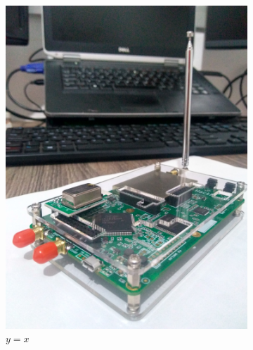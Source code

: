 \documentclass[
  12pt,				%
  openright,			%
  twoside,			%
  a4paper,			%
  english,			%
  french,				%
  spanish,			%
  brazil,				%
  ]{abntex2}
\begin{document}
\begin{figure}[ht]
\begin{subfigure}[b]{0.45\linewidth}
    \includegraphics[width=\linewidth]{figures/hackrf/hack_rf.jpg}
    \caption{$y=x$}
    \label{fig:hack_rf}
  \end{subfigure}
  \hspace{0.5cm}
  \begin{subfigure}[b]{0.45\linewidth}
    \centering

\end{subfigure}
\end{figure}
\end{document}
